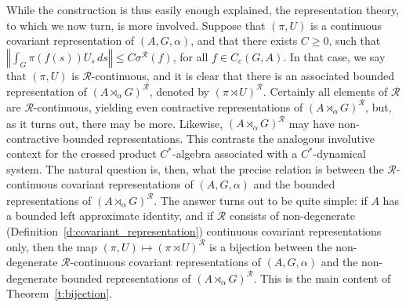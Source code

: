 \documentclass{amsart}
\theoremstyle{plain}
\theoremstyle{definition}
\numberwithin{equation}{section}
\begin{document}
While the construction is thus easily enough explained, the representation theory, to which we now turn, is more involved. Suppose that ${(\pi,U)}$ is a continuous covariant representation of ${(A,G,\alpha)}$, and that there exists $C\geq 0$, such that ${\left\Vert {\int_G \pi(f(s))U_s{\,ds}} \right\Vert}\leq C{\sigma^{\mathcal R}}(f)$, for all $f\in C_c(G,A)$. In that case, we say that ${(\pi,U)}$ is ${\mathcal R}$-continuous, and it is clear that there is an associated bounded representation of ${(A {\rtimes}_\alpha G)^\mathcal{R}}$, denoted by ${(\pi \rtimes U)^\mathcal R}$. Certainly all elements of ${\mathcal R}$ are ${\mathcal R}$-continuous, yielding even contractive representations of ${(A {\rtimes}_\alpha G)^\mathcal{R}}$, but, as it turns out, there may be more. Likewise, ${(A {\rtimes}_\alpha G)^\mathcal{R}}$ may have non-contractive bounded representations. This contrasts the analogous involutive context for the crossed product $C^*$-algebra associated with a $C^*$-dynamical system. The natural question is, then, what the precise relation is between the ${\mathcal R}$-continuous covariant representations of ${(A,G,\alpha)}$ and the bounded representations of ${(A {\rtimes}_\alpha G)^\mathcal{R}}$. The answer turns out to be quite simple: if $A$ has a bounded left approximate identity, and if ${\mathcal R}$ consists of non-degenerate (Definition~\ref{d:covariant_representation}) continuous covariant representations only, then the map ${(\pi,U)}\mapsto{(\pi \rtimes U)^\mathcal R}$ is a bijection between the non-degenerate ${\mathcal R}$-continuous covariant representations of ${(A,G,\alpha)}$ and the non-degenerate bounded representations of ${(A {\rtimes}_\alpha G)^\mathcal{R}}$. This is the main content of Theorem~\ref{t:bijection}. 
\end{document}
